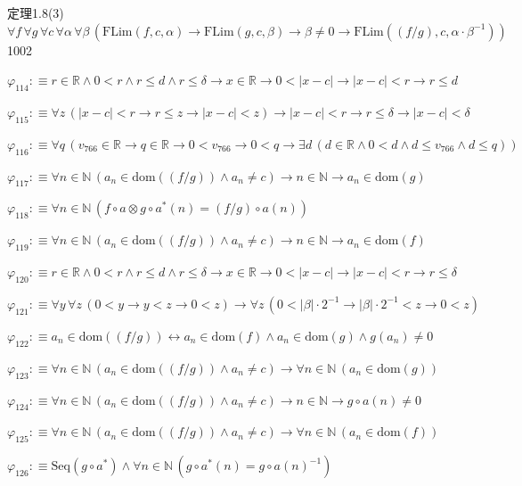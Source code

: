 \begin{fullproof}{定理1.8(3)}{$\forall f\,\forall g\,\forall c\,\forall \alpha\,\forall \beta\,(\mathrm{FLim}(f,c,\alpha) \to \mathrm{FLim}(g,c,\beta) \to \beta \neq 0 \to \mathrm{FLim}((f / g),c,\alpha \cdot \beta^{-1}))$}{1002}
\begin{abbrevlist}
\item $\varphi_{114} :\equiv r \in \mathbb{R} \land 0 < r \land r \leq d \land r \leq \delta \to x \in \mathbb{R} \to 0 < \lvert x - c \rvert \to \lvert x - c \rvert < r \to r \leq d$
\item $\varphi_{115} :\equiv \forall z\,(\lvert x - c \rvert < r \to r \leq z \to \lvert x - c \rvert < z) \to \lvert x - c \rvert < r \to r \leq \delta \to \lvert x - c \rvert < \delta$
\item $\varphi_{116} :\equiv \forall q\,(v_{766} \in \mathbb{R} \to q \in \mathbb{R} \to 0 < v_{766} \to 0 < q \to \exists d\,(d \in \mathbb{R} \land 0 < d \land d \leq v_{766} \land d \leq q))$
\item $\varphi_{117} :\equiv \forall n \in \mathbb{N}\,(a_{n} \in \mathrm{dom}((f / g)) \land a_{n} \neq c) \to n \in \mathbb{N} \to a_{n} \in \mathrm{dom}(g)$
\item $\varphi_{118} :\equiv \forall n \in \mathbb{N}\,(f \circ a \otimes g \circ a^{\ast}(n) = (f / g) \circ a(n))$
\item $\varphi_{119} :\equiv \forall n \in \mathbb{N}\,(a_{n} \in \mathrm{dom}((f / g)) \land a_{n} \neq c) \to n \in \mathbb{N} \to a_{n} \in \mathrm{dom}(f)$
\item $\varphi_{120} :\equiv r \in \mathbb{R} \land 0 < r \land r \leq d \land r \leq \delta \to x \in \mathbb{R} \to 0 < \lvert x - c \rvert \to \lvert x - c \rvert < r \to r \leq \delta$
\item $\varphi_{121} :\equiv \forall y\,\forall z\,(0 < y \to y < z \to 0 < z) \to \forall z\,(0 < \lvert \beta \rvert \cdot 2^{-1} \to \lvert \beta \rvert \cdot 2^{-1} < z \to 0 < z)$
\item $\varphi_{122} :\equiv a_{n} \in \mathrm{dom}((f / g)) \leftrightarrow a_{n} \in \mathrm{dom}(f) \land a_{n} \in \mathrm{dom}(g) \land g(a_{n}) \neq 0$
\item $\varphi_{123} :\equiv \forall n \in \mathbb{N}\,(a_{n} \in \mathrm{dom}((f / g)) \land a_{n} \neq c) \to \forall n \in \mathbb{N}\,(a_{n} \in \mathrm{dom}(g))$
\item $\varphi_{124} :\equiv \forall n \in \mathbb{N}\,(a_{n} \in \mathrm{dom}((f / g)) \land a_{n} \neq c) \to n \in \mathbb{N} \to g \circ a(n) \neq 0$
\item $\varphi_{125} :\equiv \forall n \in \mathbb{N}\,(a_{n} \in \mathrm{dom}((f / g)) \land a_{n} \neq c) \to \forall n \in \mathbb{N}\,(a_{n} \in \mathrm{dom}(f))$
\item $\varphi_{126} :\equiv \mathrm{Seq}(g \circ a^{\ast}) \land \forall n \in \mathbb{N}\,(g \circ a^{\ast}(n) = g \circ a(n)^{-1})$

\end{abbrevlist}
\end{fullproof}
